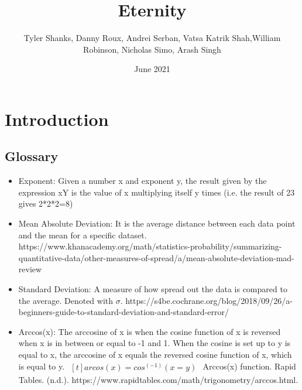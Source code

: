 \documentclass[titlepage]{article}
\begin{document}
\title{Eternity}
\author{Tyler Shanks, Danny Roux, Andrei Serban, Vatsa Katrik Shah,\newpage William Robinson, Nicholas Simo, Arash Singh}
\date{June 2021}
\maketitle

\fancyfoot{\thepage}

\tableofcontents
\newpage

\section{Introduction}
    \subsection{Glossary}
        \begin{itemize}
            \item Exponent: Given a number x and exponent y, the result given by the expression xY is the value of x multiplying itself y times (i.e. the result of 23 gives 2*2*2=8)
            \item  Mean Absolute Deviation: It is the average distance between each data point and the mean for a specific dataset. \newline https://www.khanacademy.org/math/statistics-probability/summarizing-quantitative-data/other-measures-of-spread/a/mean-absolute-deviation-mad-review
            \item Standard Deviation: A measure of how spread out the data is compared to the average. Denoted with $\sigma$. \newline https://s4be.cochrane.org/blog/2018/09/26/a-beginners-guide-to-standard-deviation-and-standard-error/
            \item Arccos(x): The arccosine of x is when the cosine function of x is reversed when x is in between or equal to -1 and 1. When the cosine is set up to y is equal to x, the arccosine of x equals the reversed cosine function of x, which is equal to y.
            $\begin{aligned}[t]
                arcos(x) = cos^(-1)(x = y)
            \end{aligned}$
            Arccos(x) function. Rapid Tables. (n.d.). \newline https://www.rapidtables.com/math/trigonometry/arccos.html.
        \end{itemize}
\end{document}
